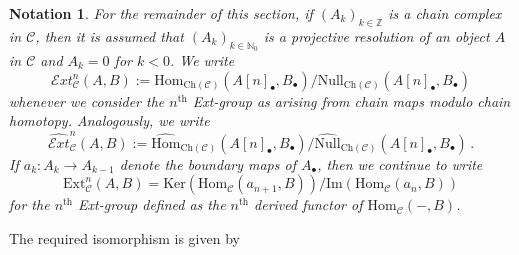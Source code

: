 \documentclass[12pt,a4paper]{article}
\numberwithin{equation}{section}
\newtheorem{notn}[thm]{Notation}
\theoremstyle{nonumberplain}
\begin{document}
\begin{notn}\label{notn:chainext}
For the remainder of this section, if $(A_k)_{k \in \mathbb{Z}}$ is a chain complex in $\mathcal{C}$, then it is assumed that $(A_k)_{k \in \mathbb{N}_0}$ is a projective resolution of an object $A$ in $\mathcal{C}$ and $A_k = 0$ for $k < 0$. We write
\[ \mathcal{E}xt_{\mathcal{C}}^n(A, B) := \mathrm{Hom}_{\mathrm{Ch}(\mathcal{C})}(A[n]_{\bullet}, B_{\bullet})/ \mathrm{Null}_{\mathrm{Ch}(\mathcal{C})}(A[n]_{\bullet}, B_{\bullet}) \]
whenever we consider the $n^{\text{th}}$ Ext-group as arising from chain maps modulo chain homotopy. Analogously, we write
\[ \widehat{\mathcal{E}xt}_{\mathcal{C}}^n(A, B) := \widehat{\mathrm{Hom}}_{\mathrm{Ch}(\mathcal{C})}(A[n]_{\bullet}, B_{\bullet})/ \widehat{\mathrm{Null}}_{\mathrm{Ch}(\mathcal{C})}(A[n]_{\bullet}, B_{\bullet}) \, . \]
If $a_k: A_k \rightarrow A_{k-1}$ denote the boundary maps of $A_{\bullet}$, then we continue to write
\[ \mathrm{Ext}_{\mathcal{C}}^n(A, B) = \mathrm{Ker}(\mathrm{Hom}_{\mathcal{C}}(a_{n+1}, B))/ \mathrm{Im}(\mathrm{Hom}_{\mathcal{C}}(a_n, B)) \]
for the $n^{\text{th}}$ Ext-group defined as the $n^{\text{th}}$ derived functor of $\mathrm{Hom}_{\mathcal{C}}(-, B)$.
\end{notn}

The required isomorphism is given by
\end{document}
